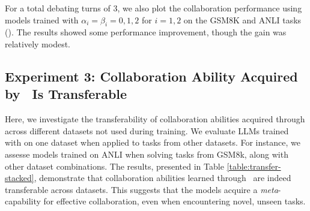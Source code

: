 {For a total debating turns of 3, we also plot the collaboration performance  using models trained with \(\alpha_i = \beta_i = 0, 1, 2\) for \(i = 1, 2\) on the GSM8K and ANLI tasks (). The results showed some performance improvement, though the gain was relatively modest.}

\safevspace{-2mm}





\subsection{Experiment 3: Collaboration Ability Acquired by \ours~Is Transferable}
Here, we investigate the transferability of collaboration abilities acquired through \oursspace across different datasets not used during training. We evaluate LLMs trained with \oursspace on one dataset when applied to tasks from other datasets. For instance, we assesse models trained on ANLI when solving tasks from GSM8k, along with other dataset combinations.
The results, presented in Table \ref{table:transfer-stacked}, demonstrate that collaboration abilities learned through \ours~are indeed transferable across datasets. This suggests that the models acquire a \textit{meta}-capability for effective collaboration, even when encountering novel, unseen tasks.


\begin{table}[!ht]
  \centering
  \caption{Performance comparison (Accuracy) of 3-agent collaboration using 
           \textit{off-the-shelf} vs.\ \textit{trained} LLMs. 
           For each dataset pair (rows in bold), the first row shows 
           the off-the-shelf performance and the second row shows the 
           trained model performance, across Turns 1--3.}
  \label{table:transfer-stacked}
\end{table}



